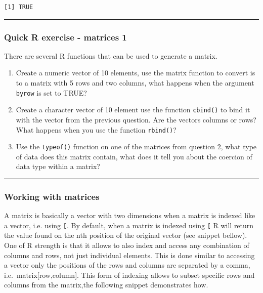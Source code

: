 \documentclass[
]{book}
\theoremstyle{definition}
\theoremstyle{definition}
\theoremstyle{definition}
\theoremstyle{definition}
\theoremstyle{remark}
\begin{document}
\begin{verbatim}
[1] TRUE
\end{verbatim}

\begin{center}\rule{0.5\linewidth}{0.5pt}\end{center}

\hypertarget{quick-r-exercise---matrices-1}{%
\subsubsection*{\texorpdfstring{\textbf{Quick R exercise - matrices 1}}{Quick R exercise - matrices 1}}\label{quick-r-exercise---matrices-1}}

There are several R functions that can be used to generate a matrix.

\begin{enumerate}
\def\labelenumi{\arabic{enumi}.}
\item
  Create a numeric vector of 10 elements, use the matrix function to convert is to a matrix with 5 rows and two columns, what happens when the argument \texttt{byrow} is set to TRUE?
\item
  Create a character vector of 10 element use the function \texttt{cbind()} to bind it with the vector from the previous question. Are the vectors columns or rows? What happens when you use the function \texttt{rbind()}?
\item
  Use the \texttt{typeof()} function on one of the matrices from question 2, what type of data does this matrix contain, what does it tell you about the coercion of data type within a matrix?
\end{enumerate}

\begin{center}\rule{0.5\linewidth}{0.5pt}\end{center}

\hypertarget{working-with-matrices}{%
\subsubsection*{\texorpdfstring{\textbf{Working with matrices}}{Working with matrices}}\label{working-with-matrices}}

A matrix is basically a vector with two dimensions when a matrix is indexed like a vector, i.e.
using \texttt{{[}}. By default, when a matrix is indexed using \texttt{{[}} R will return the value found on the
nth position of the original vector (see snippet bellow).
One of R strength is that it allows to also index and access any combination of columns and rows,
not just individual elements. This is done similar to accessing a vector only the positions of the
rows and columns are separated by a comma, i.e.~matrix{[}row,column{]}. This form of indexing allows to
subset specific rows and columns from the matrix,the following snippet demonstrates how.
\end{document}
